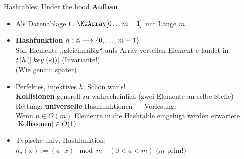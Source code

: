 \begin{frame}{Hashtables: Under the hood} 
	\textbf{Aufbau} \\
	\begin{itemize}
		\item Als Datenablage \impl $t: \KwArray[0 \dots m-1]$ mit Länge $m$
		\pause
		\item \textbf{Hashfunktion} $h: \mathbb{Z} \longrightarrow \{0, \dots, m-1\}$ \\
		Soll Elemente „gleichmäßig“ aufs Array verteilen
		\pause
		\implitem Element $e$ landet in $t\left\lbrack h\left(\|key|(e) \right)\right\rbrack$ \quad  (Invariante!) \\
		{\small (Wie genau: später)}
		\pause
		\item[\Cons] Perfektes, injektives $h$: Schön wär's! \\
		\impl \textbf{Kollisionen} generell zu wahrscheinlich {\small (zwei Elemente an selbe Stelle)}
		\pause
		\implitem Rettung: \textbf{universelle} Hashfunktionen \quad --- \quad  Vorlesung: \\
		Wenn $n \in O(m)$ Elemente in die Hashtable eingefügt werden \impl erwartete $ \left|\text{Kollisionen}\right| \in O(1)$ 
		\pause
		\item Typische univ. Hashfunktion: \\
		$h_a(x) := (a \cdot x) \mod m \quad (0 < a < m)$ \quad ($m$ prim!)
		
	\end{itemize}
\end{frame}

